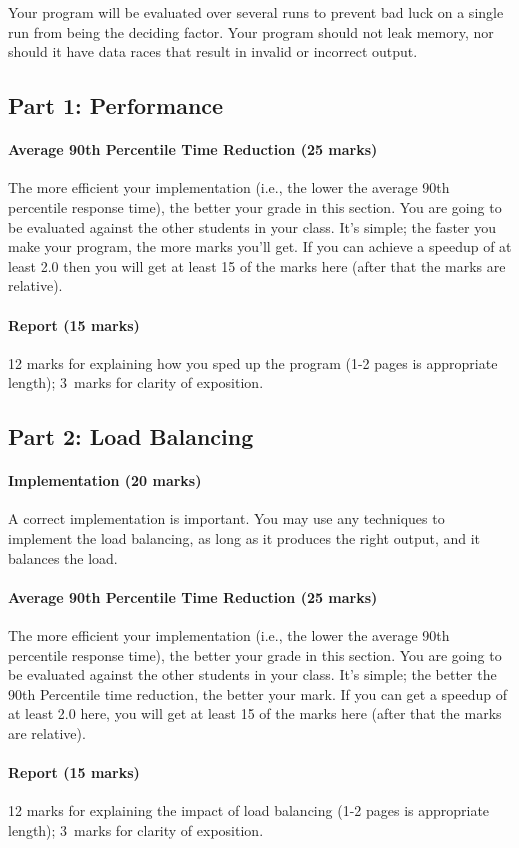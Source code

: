 \documentclass[letterpaper,10pt]{article}
\begin{document}
Your program will be evaluated over several runs to prevent bad luck on a single run from being the deciding factor. Your program should not leak memory, nor should it have data races that result in invalid or incorrect output. 

\subsection*{Part 1: Performance}

\paragraph{Average 90th Percentile Time Reduction (25 marks)} The more efficient your implementation (i.e., the lower the average 90th percentile response time), the better your grade in this section.  You are going to be evaluated against the other students in your class. It's simple; the faster you make your program, the more marks
you'll get. If you can achieve a speedup of at least 2.0 then you will get at least 15 of the marks here (after that the marks are relative).

\paragraph{Report (15 marks)} 12 marks for explaining how you sped up the program (1-2 pages is appropriate length); 3~marks for clarity of exposition.

\subsection*{Part 2: Load Balancing}

\paragraph{Implementation (20 marks)} A correct implementation is important. You may use any techniques to implement the load balancing, as long as it produces the right output, and it balances the load.

\paragraph{Average 90th Percentile Time Reduction (25 marks)} The more efficient your implementation (i.e., the lower the average 90th percentile response time), the better your grade in this section.  You are going to be evaluated against the other students in your class. It's simple; the better the 90th Percentile time reduction, the better your mark. If you can get a speedup of at least 2.0 here, you will get at least 15 of the marks here (after that the marks are relative).

\paragraph{Report (15 marks)} 12 marks for explaining the impact of load balancing (1-2 pages is appropriate length); 3~marks for clarity of exposition.
\end{document}
